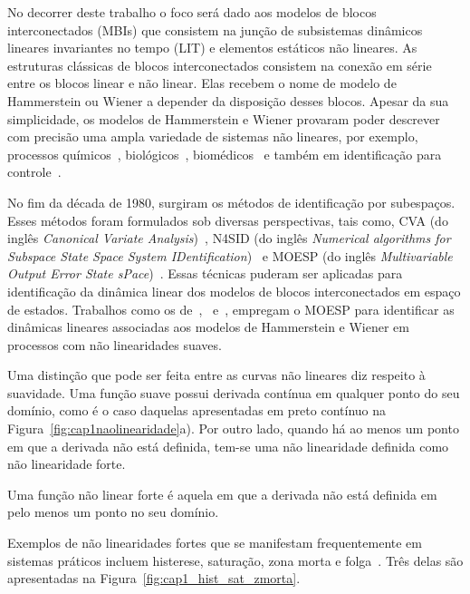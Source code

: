 \par 
No decorrer deste trabalho o foco será dado aos modelos de blocos interconectados (\acsp{MBI}) que consistem na junção de subsistemas dinâmicos lineares invariantes no tempo (\acs{LIT}) e elementos estáticos não lineares. As estruturas clássicas de blocos interconectados consistem na conexão em série entre os  blocos linear e não linear. Elas recebem o nome de modelo de Hammerstein ou Wiener a depender da disposição desses blocos. Apesar da sua simplicidade, os modelos de Hammerstein e Wiener provaram poder descrever com precisão uma ampla variedade de sistemas não lineares, por exemplo, processos químicos~\citep{zou2015,roy2016,li2016}, biológicos~\citep{kian2013,fracz2016}, biomédicos~\citep{kian2013,najafabadi2016} e também em identificação para controle~\citep{biagiola2016,zhang2017,rayouf2018,li2022}.
\par 
No fim da década de 1980, surgiram os métodos de identificação por subespaços. Esses métodos foram formulados sob diversas perspectivas, tais como, \acs{CVA} (do inglês \textit{Canonical Variate Analysis})~\citep{larimore1990}, \acs{N4SID} (do inglês \textit{Numerical algorithms for Subspace State Space System IDentification})~\citep{van1994} e \acs{MOESP} (do inglês \textit{Multivariable Output Error State sPace})~\citep{verhaegen1992a,verhaegen1992b}. Essas técnicas puderam ser aplicadas para identificação da dinâmica linear dos modelos de blocos interconectados em espaço de estados. Trabalhos como os de~\citep{gomez2005},~\citep{depaula2015} e~\citep{santos2021}, empregam o \acs{MOESP} para identificar as dinâmicas lineares associadas aos modelos de Hammerstein e Wiener em processos com não linearidades suaves.
\par
Uma distinção que pode ser feita entre as curvas não lineares diz respeito à suavidade. Uma função suave possui derivada contínua em qualquer ponto do seu domínio, como é o caso daquelas apresentadas em preto contínuo na Figura~\ref{fig:cap1naolinearidade}a). Por outro lado, quando há ao menos um ponto em que a derivada não está definida, tem-se uma não linearidade definida como não linearidade forte. 
%
\begin{definicao}
	Uma função não linear forte é aquela em que a derivada não está definida em pelo menos um ponto no seu domínio. 
\end{definicao}
%
Exemplos de não linearidades fortes que se manifestam frequentemente em sistemas práticos incluem histerese, saturação, zona morta e folga~\citep{grimble2020}. Três delas são apresentadas na Figura~\ref{fig:cap1_hist_sat_zmorta}. 
